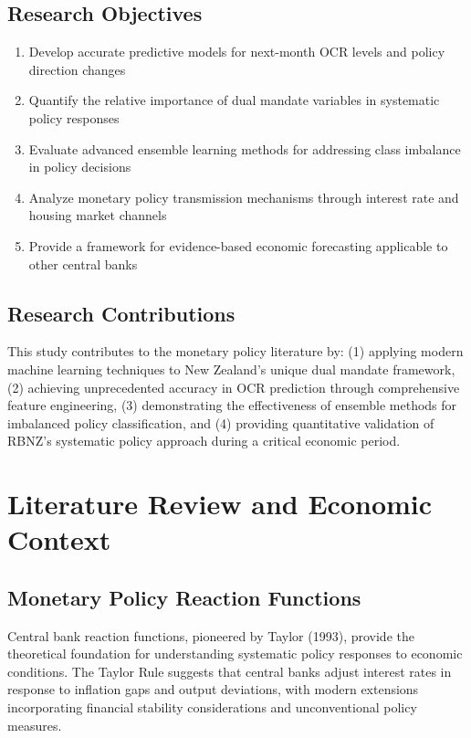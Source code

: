 \documentclass[11pt,a4paper]{article}
\begin{document}
	\subsection{Research Objectives}
	\begin{enumerate}
		\item Develop accurate predictive models for next-month OCR levels and policy direction changes
		\item Quantify the relative importance of dual mandate variables in systematic policy responses  
		\item Evaluate advanced ensemble learning methods for addressing class imbalance in policy decisions
		\item Analyze monetary policy transmission mechanisms through interest rate and housing market channels
		\item Provide a framework for evidence-based economic forecasting applicable to other central banks
	\end{enumerate}
	
	\subsection{Research Contributions}
	This study contributes to the monetary policy literature by: (1) applying modern machine learning techniques to New Zealand's unique dual mandate framework, (2) achieving unprecedented accuracy in OCR prediction through comprehensive feature engineering, (3) demonstrating the effectiveness of ensemble methods for imbalanced policy classification, and (4) providing quantitative validation of RBNZ's systematic policy approach during a critical economic period.
	
	\section{Literature Review and Economic Context}
	
	\subsection{Monetary Policy Reaction Functions}
	Central bank reaction functions, pioneered by Taylor (1993), provide the theoretical foundation for understanding systematic policy responses to economic conditions. The Taylor Rule suggests that central banks adjust interest rates in response to inflation gaps and output deviations, with modern extensions incorporating financial stability considerations and unconventional policy measures.
	
\end{document}
